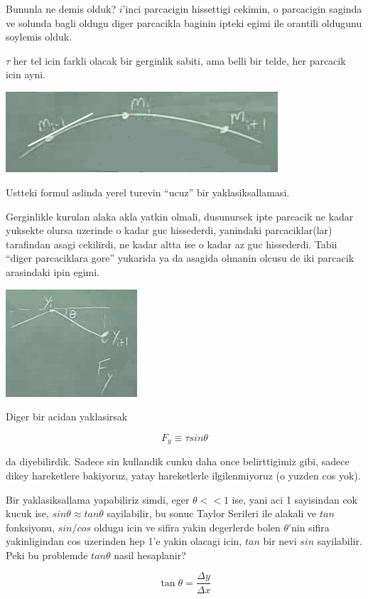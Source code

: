 \documentclass[12pt,fleqn]{article}
\begin{document}
Bununla ne demis olduk? $i$'inci parcacigin hissettigi cekimin, o
parcacigin saginda ve solunda bagli oldugu diger parcacikla baginin ipteki
egimi ile orantili oldugunu soylemis olduk.

$\tau$ her tel icin farkli olacak bir gerginlik sabiti, ama belli bir
telde, her parcacik icin ayni. 

\includegraphics[height=3cm]{1_08.png}

Ustteki formul aslinda yerel turevin ``ucuz'' bir yaklasiksallamasi. 

Gerginlikle kurulan alaka akla yatkin olmali, dusunursek ipte parcacik ne
kadar yuksekte olursa uzerinde o kadar guc hissederdi, yanindaki
parcaciklar(lar) tarafindan asagi cekilirdi, ne kadar altta ise o kadar az
guc hissederdi. Tabii ``diger parcaciklara gore'' yukarida ya da asagida
olmanin olcusu de iki parcacik arasindaki ipin egimi. 

\includegraphics[height=4cm]{1_09.png}

Diger bir acidan yaklasirsak

\[ F_y \equiv \tau sin\theta \]

da diyebilirdik. Sadece sin kullandik cunku daha once belirttigimiz gibi,
sadece dikey hareketlere bakiyoruz, yatay hareketlerle ilgilenmiyoruz (o
yuzden cos yok).

Bir yaklasiksallama yapabiliriz simdi, eger $\theta << 1$ ise, yani aci 1
sayisindan cok kucuk ise, $sin\theta \approx tan\theta$ sayilabilir, bu
sonuc Taylor Serileri ile alakali ve $tan$ fonksiyonu, $sin / cos$ oldugu
icin ve sifira yakin degerlerde bolen $\theta$'nin sifira yakinligindan cos
uzerinden hep 1'e yakin olacagi icin, $tan$ bir nevi $sin$
sayilabilir. Peki bu problemde $tan\theta$ nasil hesaplanir?

\[  \tan\theta = \frac{\Delta y}{\Delta x} \]
\end{document}
